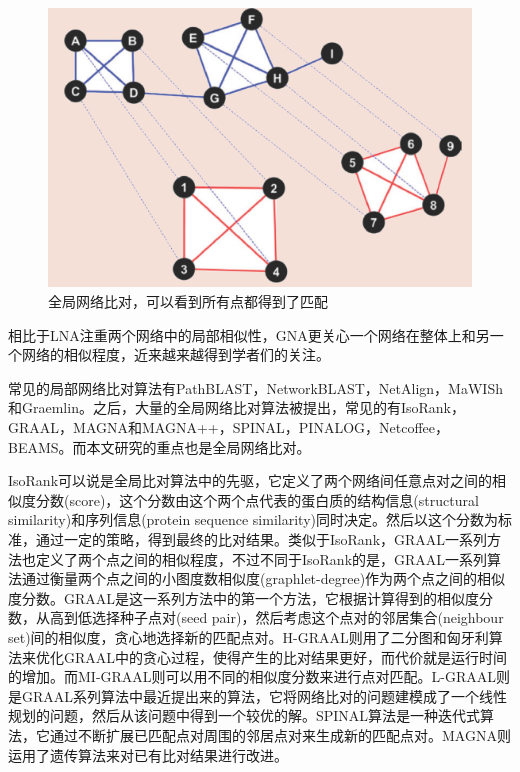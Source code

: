 \begin{figure}[htbp]
\centering
\includegraphics[height=0.25\textheight]{pic/gna.png}
\caption{全局网络比对，可以看到所有点都得到了匹配 \cite{atias2012comparative} \label{fig:gna}}
\end{figure}
相比于LNA注重两个网络中的局部相似性，GNA更关心一个网络在整体上和另一个网络的相似程度，近来越来越得到学者们的关注。

常见的局部网络比对算法有PathBLAST\cite{kelley2004pathblast}，NetworkBLAST\cite{sharan2005conserved}，NetAlign\cite{liang2006netalign}，MaWISh\cite{koyuturk2006pairwise}和Graemlin\cite{flannick2006graemlin}。之后，大量的全局网络比对算法被提出，常见的有IsoRank\cite{singh2008global,liao2009isorankn}，GRAAL\cite{kuchaiev2011integrative,malod2015graal,kuchaiev2010topological,milenkovic2010optimal,memivsevic2012c}，MAGNA和MAGNA++\cite{saraph2014magna,vijayan2015magna++}，SPINAL\cite{aladaug2013spinal}，PINALOG\cite{phan2012pinalog}，Netcoffee\cite{hu2013netcoffee}，BEAMS\cite{alkan2014beams}。而本文研究的重点也是全局网络比对。

IsoRank\cite{singh2008global}可以说是全局比对算法中的先驱，它定义了两个网络间任意点对之间的相似度分数(score)，这个分数由这个两个点代表的蛋白质的结构信息(structural similarity)和序列信息(protein sequence similarity)同时决定。然后以这个分数为标准，通过一定的策略，得到最终的比对结果。类似于IsoRank，GRAAL一系列方法也定义了两个点之间的相似程度，不过不同于IsoRank的是，GRAAL一系列算法通过衡量两个点之间的小图度数相似度(graphlet-degree)作为两个点之间的相似度分数。GRAAL\cite{kuchaiev2010topological}是这一系列方法中的第一个方法，它根据计算得到的相似度分数，从高到低选择种子点对(seed pair)，然后考虑这个点对的邻居集合(neighbour set)间的相似度，贪心地选择新的匹配点对。H-GRAAL\cite{milenkovic2010optimal}则用了二分图和匈牙利算法来优化GRAAL中的贪心过程，使得产生的比对结果更好，而代价就是运行时间的增加。而MI-GRAAL\cite{kuchaiev2011integrative}则可以用不同的相似度分数来进行点对匹配。L-GRAAL\cite{malod2015graal}则是GRAAL系列算法中最近提出来的算法，它将网络比对的问题建模成了一个线性规划的问题，然后从该问题中得到一个较优的解。SPINAL算法\cite{aladaug2013spinal}是一种迭代式算法，它通过不断扩展已匹配点对周围的邻居点对来生成新的匹配点对。MAGNA\cite{saraph2014magna}则运用了遗传算法来对已有比对结果进行改进。

